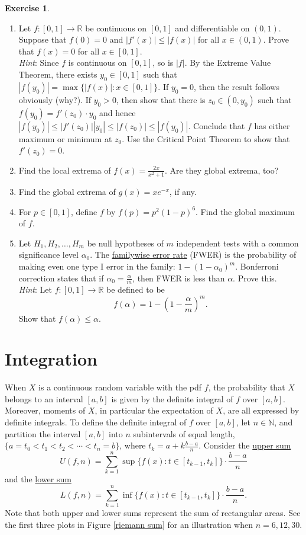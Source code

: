 \documentclass[12pt,letterpaper]{book}
\numberwithin{equation}{section}
\theoremstyle{definition}
\newtheorem{exercise}{\textbf{Exercise}}[chapter]
\begin{document}
\begin{exercise} \quad
\begin{enumerate}[\bfseries 1.]
\item Let $f:[0,1]\to \mathbb{R}$ be continuous on $[0,1]$ and differentiable on $(0,1)$. Suppose that $f(0)=0$ and $|f'(x)|\leq |f(x)|$ for all $x\in (0,1)$. Prove that $f(x)=0$ for all $x\in [0,1]$.\\
\textit{Hint}: Since $f$ is continuous on $[0,1]$, so is $|f|$. By the Extreme Value Theorem, there exists $y_0\in [0,1]$ such that $|f(y_0)|=\max\{|f(x)|:x\in [0,1]\}$. If $y_0=0$, then the result follows obviously (why?). If $y_0>0$, then show that there is $z_0\in (0,y_0)$ such that $f(y_0)=f'(z_0)\cdot y_0$ and hence $|f(y_0)|\leq |f'(z_0)||y_0|\leq |f(z_0)|\leq |f(y_0)|$. Conclude that $f$ has either maximum or minimum at $z_0$. Use the Critical Point Theorem to show that $f'(z_0)=0$.
\item Find the local extrema of $f(x)=\frac{2x}{x^2+1}$. Are they global extrema, too?
\item  Find the global extrema of $g(x)=xe^{-x}$, if any.
\item For $p\in [0,1]$, define $f$ by $f(p)=p^2(1-p)^6$. Find the global maximum of $f$.
\item Let $H_1,H_2,\ldots,H_m$ be null hypotheses of $m$ independent tests with a common significance level $\alpha_0$. The \underline{familywise error rate} (FWER) is the probability of making even one type I error in the family: $1-(1-\alpha_0)^m$. Bonferroni correction states that if $\alpha_0=\frac{\alpha}{m}$, then FWER is less than $\alpha$. Prove this. \\\textit{Hint}: Let $f:[0,1]\to \mathbb{R}$ be defined to be 
$$f(\alpha)=1-\left(1-\frac{\alpha}{m}\right)^m.$$ Show that $f(\alpha)\leq \alpha$.

\end{enumerate}
\end{exercise}

\section{Integration}

When $X$ is a continuous random variable with the pdf $f$, the probability that $X$ belongs to an interval $[a,b]$ is given by the definite integral of $f$ over $[a,b]$. Moreover, moments of $X$, in particular the expectation of $X$, are all expressed by definite integrals. To define the definite integral of $f$ over $[a,b]$, let $n\in \mathbb{N}$, and partition the interval $[a,b]$ into $n$ subintervals of equal length, $\{a=t_0<t_1<t_2<\cdots<t_n=b\}$, where $t_k=a+k\frac{b-a}{n}$. Consider the \underline{upper sum}
$$U(f,n)=\sum_{k=1}^n \sup\{f(x):t\in [t_{k-1},t_k]\}\cdot\frac{b-a}{n}$$
and the \underline{lower sum}
$$L(f,n)=\sum_{k=1}^n \inf\{f(x):t\in [t_{k-1},t_k]\}\cdot\frac{b-a}{n}.$$
Note that both upper and lower sums represent the sum of rectangular areas. See the first three plots in Figure \ref{riemann sum} for an illustration when $n=6,12,30$.
\end{document}
